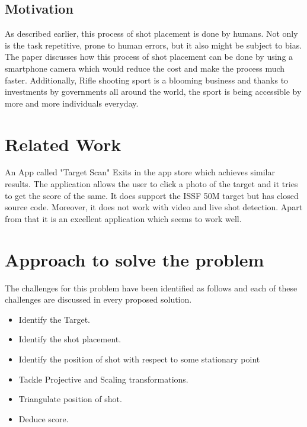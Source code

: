 \documentclass[10pt,twocolumn,letterpaper]{article}
\begin{document}
\subsection{Motivation}
As described earlier, this process of shot placement is done by humans. Not only is the task repetitive, prone to human errors, but it also might be subject to bias. The paper discusses how this process of shot placement can be done by using a smartphone camera which would reduce the cost and make the process much faster. Additionally, Rifle shooting sport is a blooming business and thanks to investments by governments all around the world, the sport is being accessible by more and more individuals everyday.

\section{Related Work}

An App called "Target Scan" \cite{TargetScanApp} Exits in the app store which achieves similar results. The application allows the user to click a photo of the target and it tries to get the score of the same. It does support the ISSF 50M target but has closed source code. Moreover, it does not work with video and live shot detection. Apart from that it is an excellent application which seems to work well.
\section{Approach to solve the problem}

The challenges for this problem have been identified as follows and each of these challenges are discussed in every proposed solution.
\begin{itemize}
\item Identify the Target.​

\item Identify the shot placement.

\item Identify the position of shot with respect to some stationary point

\item Tackle Projective and Scaling transformations.​

\item Triangulate position of shot.​

\item Deduce score.
\end{itemize}	
\end{document}
